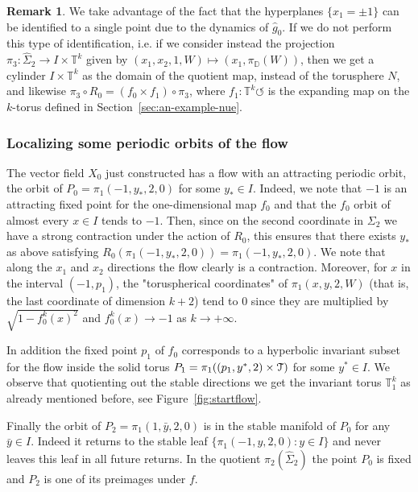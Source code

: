 \documentclass[reqno,12pt,a4paper]{amsart}
\theoremstyle{plain}
\theoremstyle{definition}
\newtheorem{remark}[theorem]{Remark}
\begin{document}
\begin{remark}
  \label{rmk:cylinder}
  We take advantage of the fact that the hyperplanes
  $\{x_1=\pm1\}$ can be identified to a single point due to
  the dynamics of $\hat g_0$. If we do not perform this type
  of identification, i.e. if we consider instead the
  projection $\pi_3:\hat\Sigma_2\to I\times{{\mathbb T}}^k$ given by
  $(x_1,x_2,1,W)\mapsto(x_1,\pi_{{\mathbb D}}(W))$,
  then we get a cylinder $I\times{{\mathbb T}}^k$ as the domain of the
  quotient map, instead of the torusphere $N$, and likewise
  $\pi_3\circ R_0 = (f_0\times f_1)\circ \pi_3$, where
  $f_1:{{\mathbb T}}^k\circlearrowleft$ is the expanding map on the
  $k$-torus defined in Section~\ref{sec:an-example-nue}.
\end{remark}

\subsubsection{Localizing some periodic orbits of the flow}
\label{sec:some-period-orbits}

The vector field $X_0$ just constructed has a flow with an
attracting periodic orbit, the orbit of
$P_0=\pi_1(-1,y_*,2,0)$ for some $y_*\in I$. Indeed, we note
that $-1$ is an attracting fixed point for the
one-dimensional map $f_0$ and that the $f_0$ orbit of almost
every $x\in I$ tends to $-1$. Then, since on the second
coordinate in $\Sigma_2$ we have a strong contraction under
the action of $R_0$, this ensures that there exists $y_*$ as
above satisfying $R_0(\pi_1(-1,y_*,2,0))=\pi_1(-1,y_*,2,0)$.
We note that along the $x_1$ and $x_2$ directions the flow
clearly is a contraction.  Moreover, for $x$ in the interval
$(-1,p_1)$, the "toruspherical coordinates" of
$\pi_1(x,y,2,W)$ (that is, the last coordinate of dimension
$k+2$) tend to $0$ since they are multiplied by
$\sqrt{1-f_0^k(x)^2}$ and $f_0^k(x)\to-1$ as $k\to+\infty$.

In addition the fixed point $p_1$ of $f_0$ corresponds to a
hyperbolic invariant subset for the flow inside the solid
torus $P_1=\pi_1((p_1,y^*,2)\times{\EuScript{T}})$ for some $y^*\in I$.
We observe that quotienting out the stable directions we get the
invariant torus ${{\mathbb T}}^k_1$ as already mentioned before, see
Figure~\ref{fig:startflow}.

Finally the orbit of $P_2=\pi_1(1,\bar y,2,0)$ is in the
stable manifold of $P_0$ for any $\bar y\in I$. Indeed it
returns to the stable leaf $\{\pi_1(-1,y,2,0):y\in I\}$ and
never leaves this leaf in all future returns. In the
quotient $\pi_2(\hat\Sigma_2)$ the point $P_0$ is fixed and
$P_2$ is one of its preimages under $f$.
\end{document}
